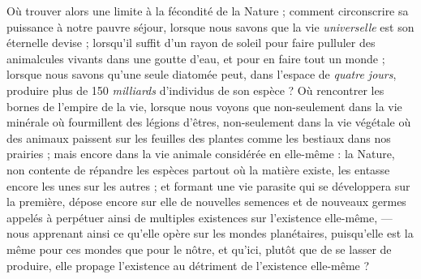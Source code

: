 \documentclass[a4paper, 11pt, oneside]{article}
\begin{document}
Où trouver alors une limite à la fécondité de la Nature ; comment circonscrire sa puissance à notre pauvre séjour, lorsque nous savons que la vie \emph{universelle} est son éternelle devise ; lorsqu'il suffit d'un rayon de soleil pour faire pulluler des animalcules vivants dans une goutte d'eau, et pour en faire tout un monde ; lorsque nous savons qu'une seule diatomée peut, dans l'espace de \emph{quatre jours}, produire plus de 150 \emph{milliards} d'individus de son espèce ? Où rencontrer les bornes de l'empire de la vie, lorsque nous voyons que non-seulement dans la vie minérale où fourmillent des légions d'êtres, non-seulement dans la vie végétale où des animaux paissent sur les feuilles des plantes comme les bestiaux dans nos prairies ; mais encore dans la vie animale considérée en elle-même : la Nature, non contente de répandre les espèces partout où la matière existe, les entasse encore les unes sur les autres ; et formant une vie parasite qui se développera sur la première, dépose encore sur elle de nouvelles semences et de nouveaux germes appelés à perpétuer ainsi de multiples existences sur l'existence elle-même, --- nous apprenant ainsi ce qu'elle opère sur les mondes planétaires, puisqu'elle est la même pour ces mondes que pour le nôtre, et qu'ici, plutôt que de se lasser de produire, elle propage l'existence au détriment de l'existence elle-même ?
\end{document}
